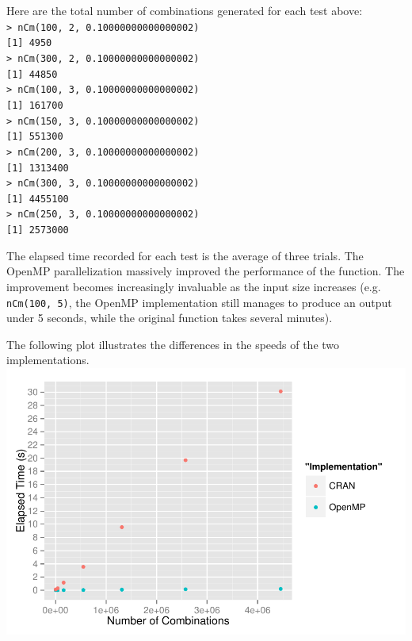 Here are the total number of combinations generated for each test above:\\
\null
\texttt{> nCm(100, 2, 0.10000000000000002)}\\
\texttt{[1] 4950}\\
\texttt{> nCm(300, 2, 0.10000000000000002)}\\
\texttt{[1] 44850}\\
\texttt{> nCm(100, 3, 0.10000000000000002)}\\
\texttt{[1] 161700}\\
\texttt{> nCm(150, 3, 0.10000000000000002)}\\
\texttt{[1] 551300}\\
\texttt{> nCm(200, 3, 0.10000000000000002)}\\
\texttt{[1] 1313400}\\
\texttt{> nCm(300, 3, 0.10000000000000002)}\\
\texttt{[1] 4455100}\\
\texttt{> nCm(250, 3, 0.10000000000000002)}\\
\texttt{[1] 2573000}\\
\null

The elapsed time recorded for each test is the average of three trials. The OpenMP parallelization massively improved the performance of the function. The improvement becomes increasingly invaluable as the input size increases (e.g. \texttt{nCm(100, 5)}, the OpenMP implementation still manages to produce an output under 5 seconds, while the original function takes several minutes).\\
\null

The following plot illustrates the differences in the speeds of the two implementations.\\
\includegraphics{openmp.pdf}

